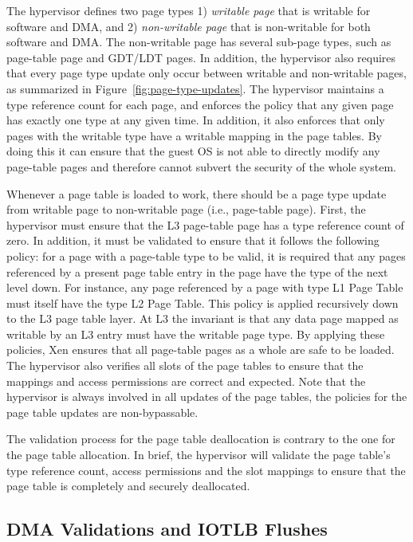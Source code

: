 The hypervisor defines two page types 1) \emph{writable page} that is writable for software and DMA, and 2) \emph{non-writable page} that is non-writable for both software and DMA.
The non-writable page has several sub-page types, such as page-table page and GDT/LDT pages.
In addition, the hypervisor also requires that every page type update only occur between writable and non-writable pages, as summarized in Figure~\ref{fig:page-type-updates}.
The hypervisor maintains a type reference count for each page, and enforces the policy that any given page has exactly one type at any given time.
In addition, it also enforces that only pages with the writable type have a writable mapping in the page tables.
By doing this it can ensure that the guest OS is not able to directly modify any page-table pages and therefore cannot subvert the security of the whole system.

Whenever a page table is loaded to work, there should be a page type update from writable page to non-writable page (i.e., page-table page).
First, the hypervisor must ensure that the L3 page-table page has a type reference count of zero.
In addition, it must be validated to ensure that it follows the following policy:
for a page with a page-table type to be valid, it is required that any pages referenced
by a present page table entry in the page have the type of the next level down.
For instance, any page referenced by a page with type L1 Page Table must itself have the type L2 Page Table.
This policy is applied recursively down to the L3 page table layer.
At L3 the invariant is that any data page mapped as writable by an L3 entry must have the writable page type.
By applying these policies, Xen ensures that all page-table pages as a whole are safe to be loaded.
The hypervisor also verifies all slots of the page tables to ensure that the mappings and access permissions are correct and expected.
Note that the hypervisor is always involved in all updates of the page tables, the policies for the page table updates are non-bypassable.

The validation process for the page table deallocation is contrary to the one for the page table allocation.
In brief, the hypervisor will validate the page table's type reference count, access permissions and the slot mappings to ensure that the page table is completely and securely deallocated.

\subsection{DMA Validations and IOTLB Flushes}
